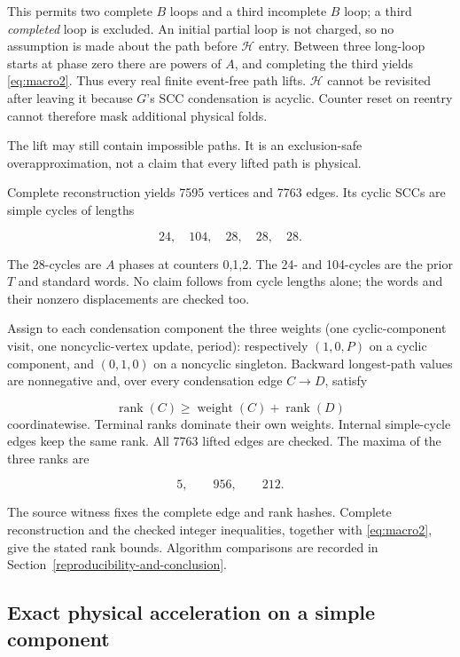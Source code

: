 This permits two complete $B$ loops and a third incomplete $B$ loop; a third
\emph{completed} loop is excluded. An initial partial loop is not charged, so
no assumption is made about the path before $\mathcal H$ entry. Between three
long-loop starts at phase zero there are powers of $A$, and completing the
third yields \eqref{eq:macro2}. Thus every real finite event-free path lifts. $\mathcal H$
cannot be revisited after leaving it because $G$'s SCC condensation is
acyclic. Counter reset on reentry cannot therefore mask additional
physical folds.

The lift may still contain impossible paths. It is an exclusion-safe
overapproximation, not a claim that every lifted path is physical.

Complete reconstruction yields 7595 vertices and 7763 edges. Its
cyclic SCCs are simple cycles of lengths

\[
24,\quad104,\quad28,\quad28,\quad28.
\]

The 28-cycles are $A$ phases at counters 0,1,2. The 24- and 104-cycles are
the prior $T$ and standard words. No claim follows from cycle lengths
alone; the words and their nonzero displacements are checked too.

Assign to each condensation component the three weights (one
cyclic-component visit, one noncyclic-vertex update, period):
respectively $(1,0,P)$ on a cyclic component, and $(0,1,0)$ on a noncyclic
singleton. Backward longest-path values are nonnegative and, over every
condensation edge $C\to D$, satisfy

\[
\operatorname{rank}(C)\ge\operatorname{weight}(C)+\operatorname{rank}(D)
\]
coordinatewise. Terminal ranks dominate their own weights. Internal
simple-cycle edges keep the same rank. All 7763 lifted edges are
checked. The maxima of the three ranks are

\begin{equation}\label{eq:macro3}
5,\qquad956,\qquad212.
\end{equation}

The source witness fixes the complete edge and rank hashes. Complete
reconstruction and the checked integer inequalities, together with
\eqref{eq:macro2}, give the stated rank bounds. Algorithm comparisons are
recorded in Section~\ref{reproducibility-and-conclusion}.

\subsection{Exact physical acceleration on a simple
component}\label{macro-5}

